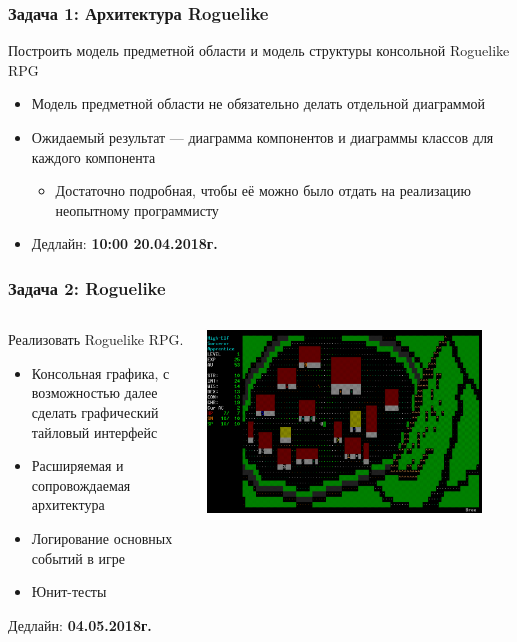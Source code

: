 \documentclass[xetex,mathserif,serif]{beamer}
\begin{document}
	\begin{frame}
		\frametitle{Задача 1: Архитектура Roguelike}
		Построить модель предметной области и модель структуры консольной Roguelike RPG
		\begin{itemize}
			\item Модель предметной области не обязательно делать отдельной диаграммой
			\item Ожидаемый результат --- диаграмма компонентов и диаграммы классов для каждого компонента
			\begin{itemize}
				\item Достаточно подробная, чтобы её можно было отдать на реализацию неопытному программисту
			\end{itemize}
			\item Дедлайн: \textbf{10:00 20.04.2018г.}
		\end{itemize}
	\end{frame}

	\begin{frame}
		\frametitle{Задача 2: Roguelike}
		\begin{columns}
			\begin{column}{0.5\textwidth}
				Реализовать Roguelike RPG.

				\begin{itemize}
					\item Консольная графика, с возможностью далее сделать графический тайловый интерфейс
					\item Расширяемая и сопровождаемая архитектура
					\item Логирование основных событий в игре
					\item Юнит-тесты
				\end{itemize}
				Дедлайн: \textbf{04.05.2018г.}
			\end{column}
			\begin{column}{0.5\textwidth}
				\begin{center}
					\includegraphics[width=0.9\textwidth]{roguelike.png}
				\end{center}
			\end{column}
		\end{columns}
	\end{frame}
\end{document}
